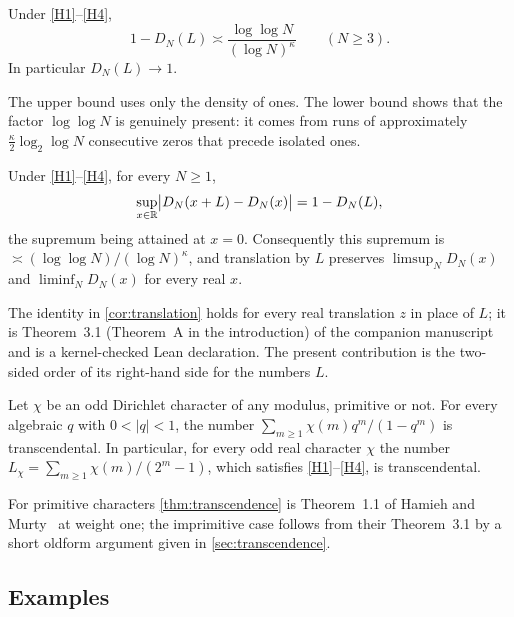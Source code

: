 \documentclass[11pt]{article}
\begin{document}
\begin{maintheorem}\label{thm:discrepancy}
Under \ref{H1}--\ref{H4},
\[
1-D_N(L)\asymp\frac{\log\log N}{(\log N)^{\kappa}}\qquad(N\ge3).
\]
In particular $D_N(L)\to1$.
\end{maintheorem}

The upper bound uses only the density of ones. The lower bound shows that the
factor $\log\log N$ is genuinely present: it comes from runs of approximately
$\frac{\kappa}{2}\log_2\log N$ consecutive zeros that precede isolated ones.

\begin{corollary}[Translation by $L$]\label{cor:translation}
Under \ref{H1}--\ref{H4}, for every $N\ge1$,
\[
\sup_{x\in\mathbb R}\bigl|D_N(x+L)-D_N(x)\bigr|=1-D_N(L),
\]
the supremum being attained at $x=0$. Consequently this supremum is
$\asymp(\log\log N)/(\log N)^{\kappa}$, and translation by $L$ preserves $\limsup_N D_N(x)$ and $\liminf_N D_N(x)$ for every real $x$.
\end{corollary}

The identity in \cref{cor:translation} holds for every real translation $z$ in
place of $L$; it is Theorem~3.1 (Theorem~A in the introduction) of the companion
manuscript~\cite{DiscrepancyCompanion} and is a kernel-checked Lean declaration.
The present contribution is the two-sided order of its right-hand side for the
numbers $L$.

\begin{maintheorem}\label{thm:transcendence}
Let $\chi$ be an odd Dirichlet character of any modulus, primitive or not. For
every algebraic $q$ with $0<|q|<1$, the number
$\sum_{m\ge1}\chi(m)q^m/(1-q^m)$ is transcendental. In particular, for every
odd real character $\chi$ the number $L_\chi=\sum_{m\ge1}\chi(m)/(2^m-1)$,
which satisfies \ref{H1}--\ref{H4}, is transcendental.
\end{maintheorem}

For primitive characters \cref{thm:transcendence} is Theorem~1.1 of Hamieh and
Murty~\cite{HamiehMurty2016} at weight one; the imprimitive case follows from
their Theorem~3.1 by a short oldform argument given in \cref{sec:transcendence}.

\subsection{Examples}\label{subsec:examples}
\end{document}
